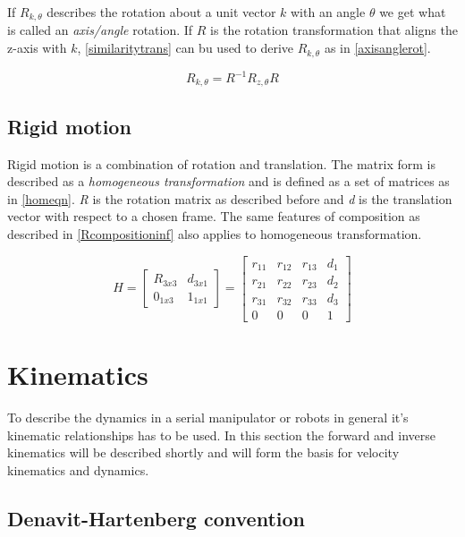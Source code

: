 If $R_{k,\theta}$ describes the rotation about a unit vector $k$ with an angle $\theta$ we get what is called an \textit{axis/angle} rotation. If $R$ is the rotation transformation that aligns the z-axis with $k$, \eqref{similaritytrans} can bu used to derive $R_{k,\theta}$ as in \eqref{axisanglerot}.

\begin{equation}\label{axisanglerot}
R_{k,\theta} = R^{-1} R_{z,\theta} R
\end{equation}

\subsection{Rigid motion}

Rigid motion is a combination of rotation and translation. The matrix form is described as a \textit{homogeneous transformation} and is defined as a set of matrices as in \eqref{homeqn}. \textit{R} is the rotation matrix as described before and \textit{d} is the translation vector with respect to a chosen frame. The same features of composition as described in \eqref{Rcompositioninf} also applies to homogeneous transformation.

\begin{equation}\label{homeqn}
H = \begin{bmatrix}
R_{3x3} & d_{3x1}\\ 
0_{1x3} & 1_{1x1}
\end{bmatrix}=\begin{bmatrix}
r_{11} & r_{12} & r_{13} & d_{1}\\ 
r_{21} & r_{22} & r_{23} & d_{2}\\ 
r_{31} & r_{32} & r_{33} & d_{3}\\ 
0 & 0 & 0 & 1
\end{bmatrix}
\end{equation}


\section{Kinematics}

To describe the dynamics in a serial manipulator or robots in general it's kinematic relationships has to be used. In this section the forward and inverse kinematics will be described shortly and will form the basis for velocity kinematics and dynamics.

\subsection{Denavit-Hartenberg convention}


